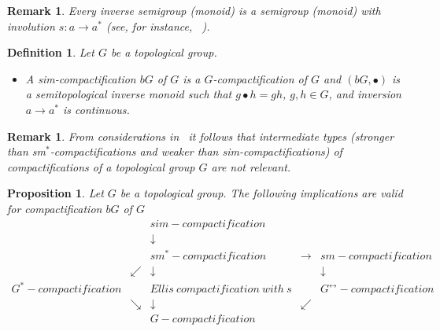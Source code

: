 \documentclass{amsart}
\newtheorem{pro}[thm]{Proposition}
\newtheorem{df}[thm]{Definition}
\newtheorem{rem}[thm]{Remark}
\begin{document}
\begin{rem}{\rm 
Every inverse semigroup  {\rm(}monoid{\rm)} is a semigroup {\rm(}monoid{\rm)} with involution $s: a\to a^*$ (see, for instance,~ \cite{Lawson}).}
\end{rem}

\begin{df}
Let $G$ be a topological group. 
\begin{itemize}
\item A sim-compactification $b G$ of $G$ is a $G$-compactification of $G$ and $(bG, \bullet)$ is a semitopological inverse monoid such that  $g\bullet h=gh$, $g, h\in G$, and inversion $a\to a^*$ is continuous.  
\end{itemize}
\end{df}

\begin{rem}
{\rm From considerations in~\cite[\S\ 2]{BITsankov} it follows that intermediate types (stronger than sm$^*$-compactifications and weaker than sim-compactifications) of compactifications of a topological group $G$ are not relevant.}
\end{rem}

\begin{pro}\label{order*comp}
Let $G$ be a topological group. The following implications are valid for compactification $b G$ of $G$
$$\begin{array}{ccccc}
 & &  sim{-}compactification  &  & \\
& & \downarrow   &  & \\
 &  & sm^*{-}compactification  &  \rightarrow   &  sm{-}compactification \\
 & \swarrow & \downarrow   &   & \downarrow \\
 G^*{-}compactification & & Ellis\ compactification\ with\ s  &  & G^{\leftrightarrow}-compactification \\
&  \searrow &  \downarrow &   \swarrow & \\
& & G{-}compactification &  & \\
\end{array}
$$
\end{pro}
\end{document}
